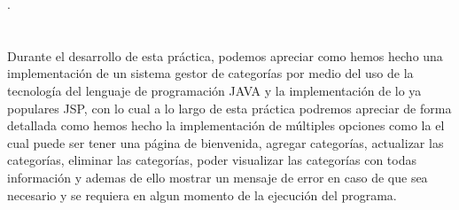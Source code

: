 \documentclass[10pt,a4paper]{article}
\begin{document}
\begin{titlepage}
	\centering
	{ \huge \bfseries \color{colorIPN}{Instituto Politécnico Nacional} \par}
	{ \Large \bfseries  \color{colorESCOM}{Escuela Superior de Cómputo} \par }
	\vspace{1cm}
	{\huge\Large \color{colorIPN}{Web App Development}.\par}
	\vspace{1.5cm}
	{\huge\Large  \color{colorESCOM}{Practica 2: JSP.}\par}
		\vspace{2cm}
	{\Large\itshape \color{colorIPN}{Profesor: M. en C. José Asunción Enríquez Zárate }\par} \hfill \break
	\vspace{2cm}
	{\Large\itshape \color{colorIPN}{Alumno: Chavarría Vázquez Luis Enrique}\par} \hfill \break
	{\Large\itshape \color{colorIPN}{luisechvz@gmail.com}\par} \hfill \break
	{\Large\itshape \color{colorIPN}{3CM4} \par}
	\vfill
	{\large \color{colorIPN}{\today}\par} 
	\vfill
\end{titlepage}

\renewcommand\lstlistingname{Quelltext} 



\tableofcontents 
\pagebreak
\listoffigures
{}

\pagebreak

\section{\color{colorIPN}{Introducción}}

Durante el desarrollo de esta práctica, podemos apreciar como hemos hecho una implementación de un sistema gestor de categorías por medio del uso de la tecnología del lenguaje de programación JAVA y la implementación de lo ya populares JSP, con lo cual a lo largo de esta práctica podremos apreciar de forma detallada como hemos hecho la implementación de múltiples opciones como la el cual puede ser tener una página de bienvenida, agregar categorías, actualizar las categorías, eliminar las categorías, poder visualizar las categorías con todas información y ademas de ello mostrar un mensaje de error en caso de que sea necesario y se requiera en algun momento de la ejecución del programa.
\end{document}
